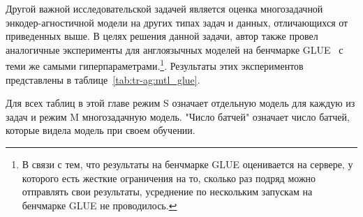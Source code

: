 Другой важной исследовательской задачей является оценка многозадачной энкодер-агностичной модели на других типах задач и данных, отличающихся от приведенных выше. В целях решения данной задачи, автор также провел аналогичные эксперименты для англоязычных моделей на бенчмарке GLUE~\cite{wang_2018} с теми же самыми гиперпараметрами.\footnote{В связи с тем, что результаты на бенчмарке GLUE оценивается на сервере, у которого есть жесткие ограничения на то, сколько раз подряд можно отправлять свои результаты, усреднение по нескольким запускам на бенчмарке GLUE не проводилось.}. Результаты этих экспериментов представлены в таблице~\ref{tab:tr-ag:mtl_glue}.

Для всех таблиц в этой главе режим S означает отдельную модель для каждую из задач и режим M многозадачную модель. "Число батчей" означает число батчей, которые видела модель при своем обучении.

\begin{table*}
 \caption{Метрики англоязычных моделей (точность/макро-F1) для пяти англоязычных диалоговых задач.Режим S означает однозадачные модели, режим M означает многозадачные модели. \textit{distilbert} означает \textit{distilbert-base-cased}, \textit{bert} - \textit{bert-base-cased}, \textit{bert-large} - \textit{bert-large-cased}. Усреднено по трем запускам, кроме \textit{distilbert}, для которого усреднение проводилось по 13 запускам.}
 \label{tab:tr-ag:en_results}
\centering
{}
\end{table*}
 

